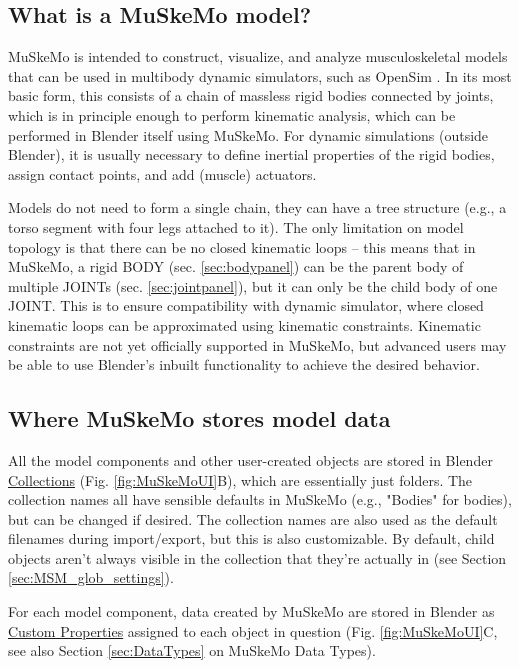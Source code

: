 \documentclass{article}
\begin{document}
\subsection{What is a MuSkeMo model?}
\label{sec:muskemomodel}
MuSkeMo is intended to construct, visualize, and analyze musculoskeletal models that can be used in multibody dynamic simulators, such as OpenSim \cite{sethOpenSimSimulatingMusculoskeletal2018}. In its most basic form, this consists of a chain of massless rigid bodies connected by joints, which is in principle enough to perform kinematic analysis, which can be performed in Blender itself using MuSkeMo. For dynamic simulations (outside Blender), it is usually necessary to define inertial properties of the rigid bodies, assign contact points, and add (muscle) actuators.

Models do not need to form a single chain, they can have a tree structure (e.g., a torso segment with four legs attached to it). The only limitation on model topology is that there can be no closed kinematic loops -- this means that in MuSkeMo, a rigid BODY (sec. \ref{sec:bodypanel}) can be the parent body of multiple JOINTs (sec. \ref{sec:jointpanel}), but it can only be the child body of one JOINT. This is to ensure compatibility with dynamic simulator, where closed kinematic loops can be approximated using kinematic constraints. Kinematic constraints are not yet officially supported in MuSkeMo, but advanced users may be able to use Blender's inbuilt functionality to achieve the desired behavior.

\subsection{Where MuSkeMo stores model data}
\label{sec:muskemodata}
All the model components and other user-created objects are stored in Blender \href{https://docs.blender.org/manual/en/latest/scene_layout/collections/collections.html}{Collections} (Fig. \ref{fig:MuSkeMoUI}B), which are essentially just folders. The collection names all have sensible defaults in MuSkeMo (e.g., "Bodies" for bodies), but can be changed if desired. The collection names are also used as the default filenames during import/export, but this is also customizable. By default, child objects aren't always visible in the collection that they're actually in (see Section \ref{sec:MSM_glob_settings}).

For each model component, data created by MuSkeMo are stored in Blender as \href{https://docs.blender.org/manual/en/latest/files/custom_properties.html}{Custom Properties} assigned to each object in question (Fig. \ref{fig:MuSkeMoUI}C, see also Section \ref{sec:DataTypes} on MuSkeMo Data Types).
\end{document}
